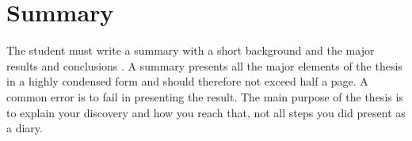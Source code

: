 
\clearpage


\pagestyle{fancy}
\fancyhead{} %

\section*{Summary}
The student must write a summary with a short background and the major results and conclusions . A summary presents all the major elements of the thesis in a highly condensed form and should therefore not exceed half a page. A common error is to fail in presenting the result. The main purpose of the thesis is to explain your discovery and how you reach that, not all steps you did present as a diary.

\begin{comment}
To write notes or comments that isn't published in the pdf.
\end{comment}